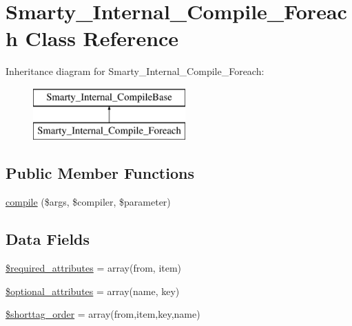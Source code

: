 \hypertarget{class_smarty___internal___compile___foreach}{}\section{Smarty\+\_\+\+Internal\+\_\+\+Compile\+\_\+\+Foreach Class Reference}
\label{class_smarty___internal___compile___foreach}
Inheritance diagram for Smarty\+\_\+\+Internal\+\_\+\+Compile\+\_\+\+Foreach\+:\begin{figure}[H]
\begin{center}
\leavevmode
\includegraphics[height=2.000000cm]{class_smarty___internal___compile___foreach}
\end{center}
\end{figure}
\subsection*{Public Member Functions}
\begin{DoxyCompactItemize}
\item 
\hyperlink{class_smarty___internal___compile___foreach_a84998958b9fc8c11c2ebe9620a49b853}{compile} (\$args, \$compiler, \$parameter)
\end{DoxyCompactItemize}
\subsection*{Data Fields}
\begin{DoxyCompactItemize}
\item 
\hyperlink{class_smarty___internal___compile___foreach_ae799507d5461de485f3a618abeecea95}{\$required\+\_\+attributes} = array(\textquotesingle{}from\textquotesingle{}, \textquotesingle{}item\textquotesingle{})
\item 
\hyperlink{class_smarty___internal___compile___foreach_a899d1eb4a6fecbd6ce696adb171c80a4}{\$optional\+\_\+attributes} = array(\textquotesingle{}name\textquotesingle{}, \textquotesingle{}key\textquotesingle{})
\item 
\hyperlink{class_smarty___internal___compile___foreach_a2ccb25269c3a92e8c4796c7ef23725e6}{\$shorttag\+\_\+order} = array(\textquotesingle{}from\textquotesingle{},\textquotesingle{}item\textquotesingle{},\textquotesingle{}key\textquotesingle{},\textquotesingle{}name\textquotesingle{})
\end{DoxyCompactItemize}


